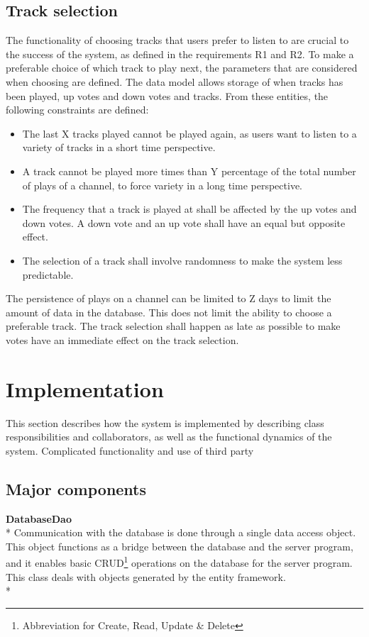 \documentclass[a4paper,11pt,report]{article}
\begin{document}
{\subsection{Track selection}
The functionality of choosing tracks that users prefer to listen to are crucial to the success of the system, as defined in the requirements R1 and R2. To make a preferable choice of which track to play next, the parameters that are considered when choosing are defined. The data model allows storage of when tracks has been played, up votes and down votes and tracks. From these entities, the following constraints are defined:
\begin{itemize}
\item The last X tracks played cannot be played again, as users want to listen to a variety of tracks in a short time perspective.
\item A track cannot be played more times than Y percentage of the total number of plays of a channel, to force variety in a long time perspective.
\item The frequency that a track is played at shall be affected by the up votes and down votes. A down vote and an up vote shall have an equal but opposite effect.
\item The selection of a track shall involve randomness to make the system less predictable.
\end{itemize}
The persistence of plays on a channel can be limited to Z days to limit the amount of data in the database. This does not limit the ability to choose a preferable track. The track selection shall happen as late as possible to make votes have an immediate effect on the track selection. 

\section{Implementation}
This section describes how the system is implemented by describing class responsibilities and collaborators, as well as the functional dynamics of the system. Complicated functionality and use of third party 

\subsection{Major components}
\textbf{DatabaseDao} \\*
Communication with the database is done through a single data access object. This object functions as a bridge between the database and the server program, and it enables basic CRUD\footnote{Abbreviation for Create, Read, Update \& Delete} operations on the database for the server program. This class deals with objects generated by the entity framework. \\*

}
\end{document}
